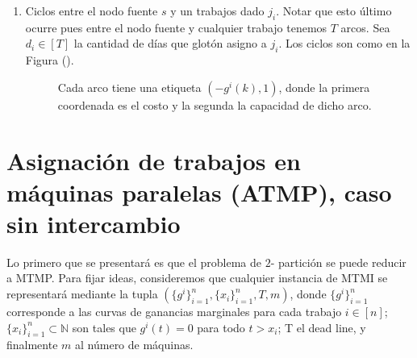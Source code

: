 \documentclass[10pt]{article}
\newcommand{\N}{\mathbb N}
\theoremstyle{plain}
\theoremstyle{definition}
\begin{document}
\begin{enumerate}
\item  Ciclos entre el nodo fuente $s$ y un trabajos dado $j_i$. Notar que esto último ocurre pues entre el nodo fuente y cualquier trabajo tenemos $T$ arcos. Sea $d_i \in [T]$ la cantidad de días que glotón asigno a $j_i$. Los ciclos son como en la Figura ().
  \begin{figure}[H]
\captionsetup{justification=centering,margin=2cm}
\begin{center}
\end{center}
\caption{Cada arco tiene una etiqueta $(-g^i(k),1)$, donde la primera coordenada es el costo y la segunda la capacidad de dicho arco.}
\label{fig:sourceWorkResid}
\end{figure} 
\end{enumerate}

\newpage
\section{Asignación de trabajos en máquinas paralelas (ATMP), caso sin intercambio}

Lo primero que se presentará es que el problema de $2$- partición se puede reducir a MTMP. Para fijar ideas, consideremos que cualquier instancia de MTMI se representará mediante la tupla $(\{g^i\}_{i=1}^n,\{x_i\}_{i=1}^n, T, m)$, donde $\{g^i\}_{i=1}^n$ corresponde a las curvas de ganancias marginales para cada trabajo $i \in [n]$; $\{x_i\}_{i=1}^n \subset \N$ son tales que $g^i(t) = 0$ para todo $t>x_i$; T el dead line, y finalmente $m$ al número de máquinas.\\~\\
\end{document}
